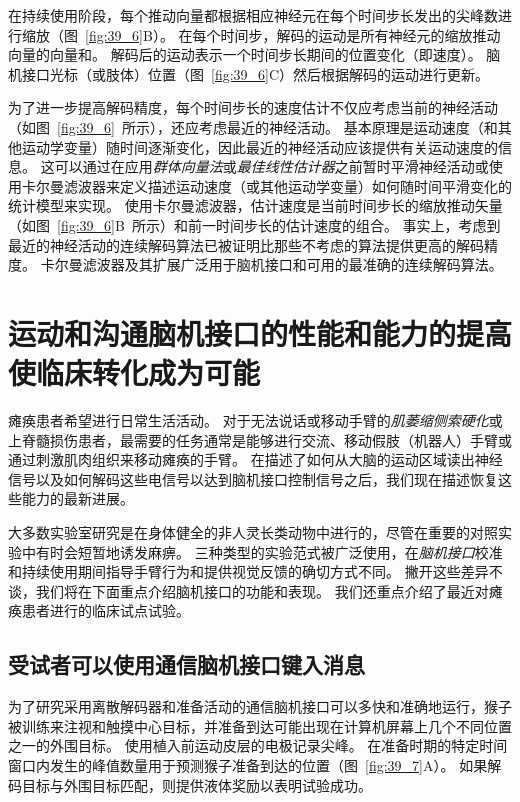 在持续使用阶段，每个推动向量都根据相应神经元在每个时间步长发出的尖峰数进行缩放（图~\ref{fig:39_6}B）。
在每个时间步，解码的运动是所有神经元的缩放推动向量的向量和。
解码后的运动表示一个时间步长期间的位置变化（即速度）。
脑机接口光标（或肢体）位置（图~\ref{fig:39_6}C）然后根据解码的运动进行更新。


为了进一步提高解码精度，每个时间步长的速度估计不仅应考虑当前的神经活动（如图~\ref{fig:39_6}~所示），还应考虑最近的神经活动。
基本原理是运动速度（和其他运动学变量）随时间逐渐变化，因此最近的神经活动应该提供有关运动速度的信息。 
这可以通过在应用\textit{群体向量法}或\textit{最佳线性估计器}之前暂时平滑神经活动或使用卡尔曼滤波器来定义描述运动速度（或其他运动学变量）如何随时间平滑变化的统计模型来实现。
使用卡尔曼滤波器，估计速度是当前时间步长的缩放推动矢量（如图~\ref{fig:39_6}B~所示）和前一时间步长的估计速度的组合。
事实上，考虑到最近的神经活动的连续解码算法已被证明比那些不考虑的算法提供更高的解码精度。
卡尔曼滤波器及其扩展广泛用于脑机接口和可用的最准确的连续解码算法。



\section{运动和沟通脑机接口的性能和能力的提高使临床转化成为可能}

瘫痪患者希望进行日常生活活动。
对于无法说话或移动手臂的\textit{肌萎缩侧索硬化}或上脊髓损伤患者，最需要的任务通常是能够进行交流、移动假肢（机器人）手臂或通过刺激肌肉组织来移动瘫痪的手臂。
在描述了如何从大脑的运动区域读出神经信号以及如何解码这些电信号以达到脑机接口控制信号之后，我们现在描述恢复这些能力的最新进展。


大多数实验室研究是在身体健全的非人灵长类动物中进行的，尽管在重要的对照实验中有时会短暂地诱发麻痹。
三种类型的实验范式被广泛使用，在\textit{脑机接口}校准和持续使用期间指导手臂行为和提供视觉反馈的确切方式不同。
撇开这些差异不谈，我们将在下面重点介绍脑机接口的功能和表现。
我们还重点介绍了最近对瘫痪患者进行的临床试点试验。



\subsection{受试者可以使用通信脑机接口键入消息}

为了研究采用离散解码器和准备活动的通信脑机接口可以多快和准确地运行，猴子被训练来注视和触摸中心目标，并准备到达可能出现在计算机屏幕上几个不同位置之一的外围目标。
使用植入前运动皮层的电极记录尖峰。
在准备时期的特定时间窗口内发生的峰值数量用于预测猴子准备到达的位置（图~\ref{fig:39_7}A）。
如果解码目标与外围目标匹配，则提供液体奖励以表明试验成功。

